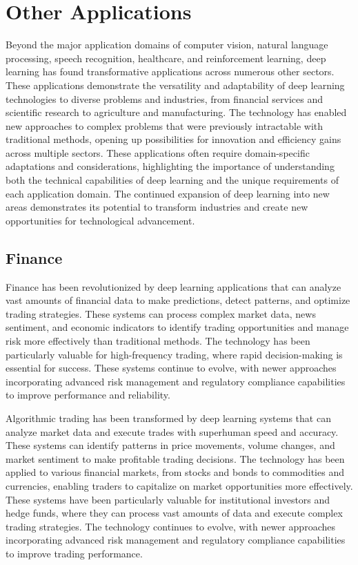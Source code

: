 
\section{Other Applications }
\label{sec:other-applications}

Beyond the major application domains of computer vision, natural language processing, speech recognition, healthcare, and reinforcement learning, deep learning has found transformative applications across numerous other sectors. These applications demonstrate the versatility and adaptability of deep learning technologies to diverse problems and industries, from financial services and scientific research to agriculture and manufacturing. The technology has enabled new approaches to complex problems that were previously intractable with traditional methods, opening up possibilities for innovation and efficiency gains across multiple sectors. These applications often require domain-specific adaptations and considerations, highlighting the importance of understanding both the technical capabilities of deep learning and the unique requirements of each application domain. The continued expansion of deep learning into new areas demonstrates its potential to transform industries and create new opportunities for technological advancement.

\subsection{Finance}

Finance has been revolutionized by deep learning applications that can analyze vast amounts of financial data to make predictions, detect patterns, and optimize trading strategies. These systems can process complex market data, news sentiment, and economic indicators to identify trading opportunities and manage risk more effectively than traditional methods. The technology has been particularly valuable for high-frequency trading, where rapid decision-making is essential for success. These systems continue to evolve, with newer approaches incorporating advanced risk management and regulatory compliance capabilities to improve performance and reliability.

Algorithmic trading has been transformed by deep learning systems that can analyze market data and execute trades with superhuman speed and accuracy. These systems can identify patterns in price movements, volume changes, and market sentiment to make profitable trading decisions. The technology has been applied to various financial markets, from stocks and bonds to commodities and currencies, enabling traders to capitalize on market opportunities more effectively. These systems have been particularly valuable for institutional investors and hedge funds, where they can process vast amounts of data and execute complex trading strategies. The technology continues to evolve, with newer approaches incorporating advanced risk management and regulatory compliance capabilities to improve trading performance.

